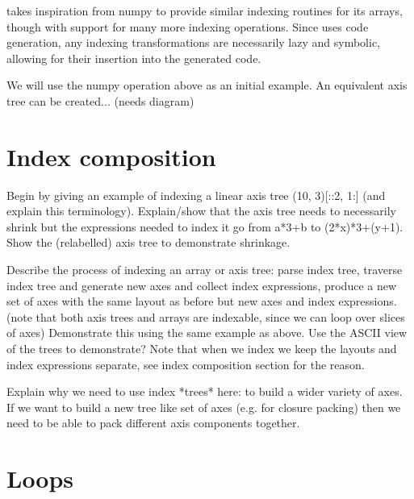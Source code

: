 \documentclass[thesis]{subfiles}
\begin{document}
 takes inspiration from numpy to provide similar indexing routines for its arrays, though with support for many more indexing operations.
Since  uses code generation, any indexing transformations are necessarily lazy and symbolic, allowing for their insertion into the generated code.

We will use the numpy operation above as an initial example.
An equivalent axis tree can be created... (needs diagram)



\section{Index composition}









Begin by giving an example of indexing a linear axis tree (10, 3)[::2, 1:] (and explain this terminology).
Explain/show that the axis tree needs to necessarily shrink but the expressions needed to index it go from a*3+b to (2*x)*3+(y+1).
Show the (relabelled) axis tree to demonstrate shrinkage.

Describe the process of indexing an array or axis tree: parse index tree, traverse index tree and generate new axes and collect index expressions, produce a new set of axes with the same layout as before but new axes and index expressions.
(note that both axis trees and arrays are indexable, since we can loop over slices of axes)
Demonstrate this using the same example as above.
Use the ASCII view of the trees to demonstrate?
Note that when we index we keep the layouts and index expressions separate, see index composition section for the reason.

Explain why we need to use index *trees* here: to build a wider variety of axes.
If we want to build a new tree like set of axes (e.g. for closure packing) then we need to be able to pack different axis components together.

\section{Loops}

\end{document}
